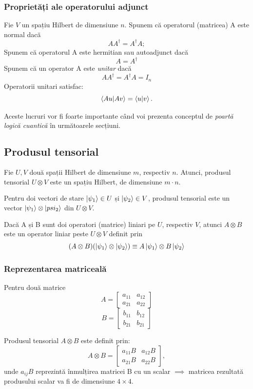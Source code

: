 \subsubsection{Proprietăți ale operatorului adjunct}

Fie $V$ un spațiu Hilbert de dimensiune $n$.
Spunem că operatorul (matricea) A este normal dacă
\[
AA^\dagger = A^\dagger A;
\]
Spunem că operatorul A este hermitian sau autoadjunct dacă 
\[
A = A^\dagger
\]
Spunem că un operator A este \textit{unitar} dacă
\[
A A^\dagger = A^\dagger A = I_n
\]
Operatorii unitari satisfac:
\[
\braket{Au|Av} = \braket{u|v}.
\]

Aceste lucruri vor fi foarte importante când voi prezenta conceptul de \textit{poartă logică cuantică} în următoarele secțiuni.

\subsection{Produsul tensorial}

Fie $U, V$ două spații Hilbert de dimensiune $m$, respectiv $n$. Atunci, produsul tensorial $U \otimes V$ este un spațiu Hilbert, de dimensiune $m \cdot n$.

Pentru doi vectori de stare $\ket{\psi_1} \in U$ și $\ket{\psi_2} \in V$, produsul tensorial este un vector $\ket{\psi_1} \otimes \ket{psi_2}$ din $U \otimes V$.

Dacă A și B sunt doi operatori (matrice) liniari pe $U$, respectiv $V$, atunci $A \otimes B$ este un operator liniar peste $U \otimes V$ definit prin
\[
(A \otimes B) (\ket{\psi_1} \otimes \ket{\psi_2}) \equiv A \ket{\psi_1} \otimes B \ket{\psi_2}
\]

\subsubsection{Reprezentarea matriceală}

Pentru două matrice 
\[
A = \begin{bmatrix}
a_{11} & a_{12} \\
a_{21} & a_{22}
\end{bmatrix}
\]
\[
B = \begin{bmatrix}
b_{11} & b_{12} \\
b_{21} & b_{21}
\end{bmatrix}
\]

Produsul tensorial $A \otimes B$ este definit prin:
\[
A \otimes B = \begin{bmatrix}
a_{11}B & a_{12}B \\
a_{21}B & a_{22}B
\end{bmatrix},
\]
unde $a_{ij}B$ reprezintă înmulțirea matricei B cu un scalar $\implies$ matricea rezultată produsului scalar va fi de dimensiune $4 \times 4$.


